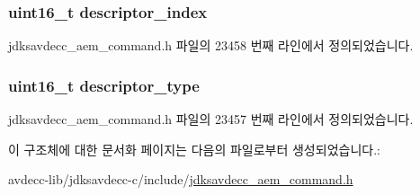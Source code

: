 \subsubsection[{\texorpdfstring{descriptor\+\_\+index}{descriptor_index}}]{\setlength{\rightskip}{0pt plus 5cm}uint16\+\_\+t descriptor\+\_\+index}\hypertarget{structjdksavdecc__aem__command__start__streaming__response_a042bbc76d835b82d27c1932431ee38d4}{}\label{structjdksavdecc__aem__command__start__streaming__response_a042bbc76d835b82d27c1932431ee38d4}


jdksavdecc\+\_\+aem\+\_\+command.\+h 파일의 23458 번째 라인에서 정의되었습니다.

\subsubsection[{\texorpdfstring{descriptor\+\_\+type}{descriptor_type}}]{\setlength{\rightskip}{0pt plus 5cm}uint16\+\_\+t descriptor\+\_\+type}\hypertarget{structjdksavdecc__aem__command__start__streaming__response_ab7c32b6c7131c13d4ea3b7ee2f09b78d}{}\label{structjdksavdecc__aem__command__start__streaming__response_ab7c32b6c7131c13d4ea3b7ee2f09b78d}


jdksavdecc\+\_\+aem\+\_\+command.\+h 파일의 23457 번째 라인에서 정의되었습니다.



이 구조체에 대한 문서화 페이지는 다음의 파일로부터 생성되었습니다.\+:\begin{DoxyCompactItemize}
\item 
avdecc-\/lib/jdksavdecc-\/c/include/\hyperlink{jdksavdecc__aem__command_8h}{jdksavdecc\+\_\+aem\+\_\+command.\+h}\end{DoxyCompactItemize}
